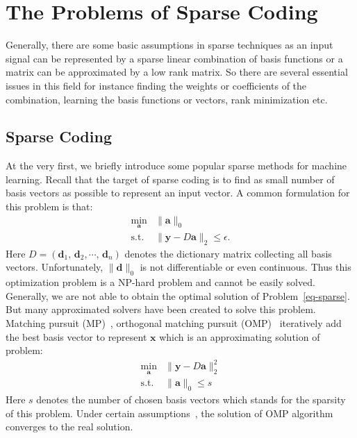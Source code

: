 \section{The Problems of Sparse Coding}
\label{sec:problem of SR}

Generally, there are some basic assumptions in sparse techniques as an input signal can be represented by a sparse linear combination of basis functions or a matrix can be approximated by a low rank matrix.
So there are several essential issues in this field for instance finding the weights or coefficients of the combination, learning the basis functions or vectors, rank minimization etc.
\subsection{Sparse Coding}
\label{subsec:sparse coding}
At the very first, we briefly introduce some popular sparse methods for machine learning.
Recall that the target of sparse coding is to find as small number of basis vectors as possible to represent an input vector.
A common formulation for this problem is that:
\begin{equation}
\begin{array}{cl}
\min_{\mathbf{a}} & \|\mathbf{a}\|_0\\
\mathrm{s.t.} & \|\mathbf{y}-D\mathbf{a}\|_2 \leq \epsilon.
\end{array}
\label{eq-sparse}
\end{equation}
Here $D=(\mathbf{d}_1,\,\mathbf{d}_2,\cdots ,\,\mathbf{d}_n)$ denotes the dictionary matrix collecting all basis vectors.
Unfortunately, $\|\mathbf{d}\|_0$ is not differentiable or even continuous.
Thus this optimization problem is a NP-hard problem and cannot be easily solved.
Generally, we are not able to obtain the optimal solution of Problem~\ref{eq-sparse}.
But many approximated solvers have been created to solve this problem.
Matching pursuit (MP)~\cite{mallat1993matching}, orthogonal matching pursuit (OMP)~\cite{pati1993orthogonal,tropp2007signal} iteratively add the best basis vector to represent $\mathbf{x}$ which is an approximating solution of problem:
\begin{equation}
\begin{array}{cl}
\min_{\mathbf{a}} & \|\mathbf{y}-D\mathbf{a}\|_2^2 \\
\mathrm{s.t.} & \|\mathbf{a}\|_0 \leq s
\end{array}
\end{equation}
Here $s$ denotes the number of chosen basis vectors which stands for the sparsity of this problem.
Under certain assumptions~\cite{pati1993orthogonal}, the solution of OMP algorithm converges to the real solution.

